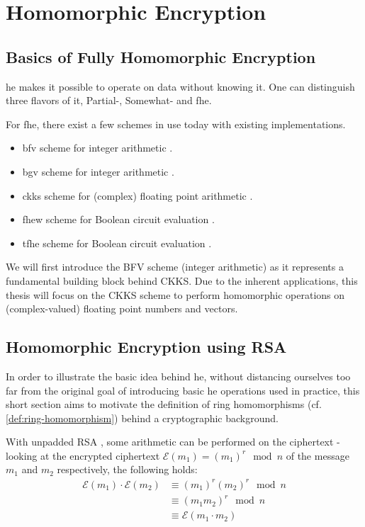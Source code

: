 \chapter{Homomorphic Encryption}
\label{chap:homomorphic-encryption}

\section{Basics of Fully Homomorphic Encryption}
\gls{he} makes it possible to operate on data without knowing it.
One can distinguish three flavors of it, Partial-, Somewhat- and \gls{fhe}.

For \Gls{fhe}, there exist a few schemes in use today with existing implementations.
\begin{itemize}
  \item \gls{bfv} scheme for integer arithmetic \parencite{2012-fv-original, 2012-brakerski}.
  \item \gls{bgv} scheme for integer arithmetic \parencite{2012-bgv-original}.
  \item \gls{ckks} scheme for (complex) floating point arithmetic \parencite{2017-ckks-original}.
  \item \gls{fhew} scheme for Boolean circuit evaluation \parencite{2015-fhew-original}.
  \item \gls{tfhe} scheme for Boolean circuit evaluation \parencite{2019-tfhe-original}.
\end{itemize}

We will first introduce the BFV scheme (integer arithmetic) as it represents a fundamental building block behind CKKS.
Due to the inherent applications, this thesis will focus on the CKKS scheme to perform homomorphic operations on (complex-valued) floating point numbers and vectors.

\section{Homomorphic Encryption using RSA}
In order to illustrate the basic idea behind \Gls{he}, without distancing ourselves too far from the original goal of introducing basic \gls{he} operations used in practice, this short section aims to motivate the definition of ring homomorphisms (cf. \autoref{def:ring-homomorphism}) behind a cryptographic background.

With unpadded RSA \parencite{1983-rsa}, some arithmetic can be performed on the ciphertext - looking at the encrypted ciphertext $\mathcal{E}(m_1) = (m_1)^r \mod n$ of the message $m_1$ and $m_2$ respectively, the following holds:
\begin{align*}
  \mathcal{E}(m_1) \cdot \mathcal{E}(m_2)
   & \equiv (m_1)^r (m_2)^r \mod n     \\
   & \equiv (m_1 m_2)^r \mod n         \\
   & \equiv \mathcal{E}(m_1 \cdot m_2)
\end{align*}

